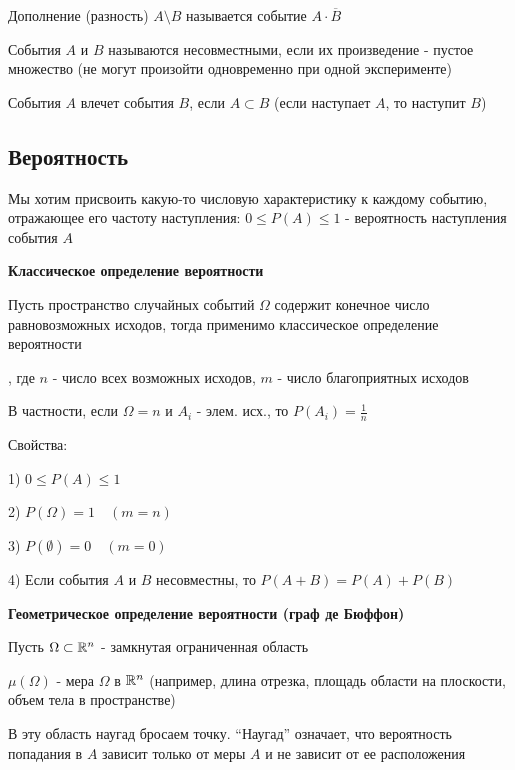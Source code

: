 \documentclass[12pt]{article}
\begin{document}
     Дополнение (разность) $A \setminus B$ называется событие $A \cdot \overline{B}$

     События $A$ и $B$ называются несовместными, если их произведение - пустое множество
    (не могут произойти одновременно при одной эксперименте)

     События $A$ влечет события $B$, если $A \subset B$ (если наступает $A$, то наступит $B$)

    \subsection{Вероятность}

    Мы хотим присвоить какую-то числовую характеристику к каждому событию,
    отражающее его частоту наступления: $0 \leq P(A) \leq 1$ - вероятность наступления события $A$

    \mediumvspace

    \textbf{Классическое определение вероятности}

    Пусть пространство случайных событий $\Omega$ содержит конечное число равновозможных исходов,
    тогда применимо классическое определение вероятности

    \Def {}, где $n$ - число всех возможных исходов, $m$ - число благоприятных исходов

    В частности, если $\Omega = n$ и $A_i$ - элем. исх., то $P(A_i) = \frac{1}{n}$

    Свойства:

    1) $0 \leq P(A) \leq 1$

    2) $P(\Omega) = 1 \quad (m = n)$

    3) $P(\emptyset) = 0 \quad (m = 0)$

    4) Если события $A$ и $B$ несовместны, то $P(A + B) = P(A) + P(B)$

    \mediumvspace

    \textbf{Геометрическое определение вероятности (граф де Бюффон)}

    Пусть $\Omega \subset \mathbb{R}^n$ - замкнутая ограниченная область

    $\mu(\Omega)$ - мера $\Omega$ в $\mathbb{R}^n$ (например, длина отрезка, площадь области на плоскости, объем тела в пространстве)

    В эту область наугад бросаем точку. \enquote{Наугад} означает, что вероятность попадания в $A$ зависит только от меры $A$ и не зависит от ее расположения
\end{document}
